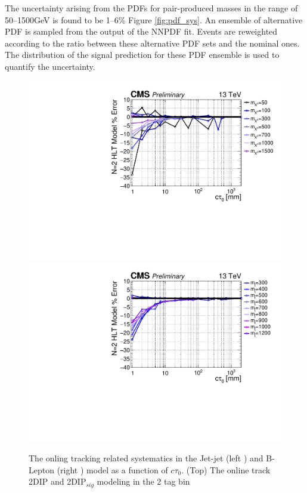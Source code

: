 The uncertainty arising from the PDFs for pair-produced masses in the
range of 50--1500GeV is found to be 1--6\% Figure \ref{fig:pdf_sys}.  An ensemble of
alternative PDF is sampled from the output of the NNPDF fit.  Events
are reweighted according to the ratio between these alternative PDF
sets and the nominal ones. The distribution of the signal prediction
for these PDF ensemble is used to quantify the uncertainty.

\begin{figure}
\begin{center}
\includegraphics[width=.45\textwidth]{figures/an/SYSTEMATICS/76x_pu/sys_2tag_hlt.pdf}
\includegraphics[width=.45\textwidth]{figures/an/SYSTEMATICS/76x_pu/sys_2tag_hlt_dsusy.pdf}
\caption{The onling tracking related systematics in the Jet-jet (left ) and B-Lepton
 (right )  model as a function of $c\tau_0$. (Top) The online track 2DIP and
 2DIP$_{sig}$ modeling in the 2 tag bin   \label{fig:online_tracking_sys}}
\end{center}
\end{figure}


